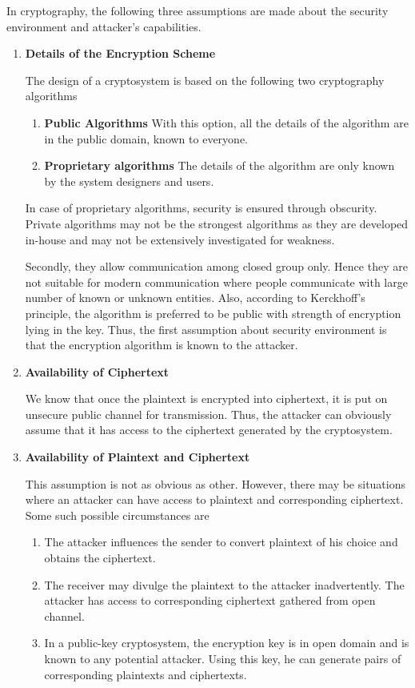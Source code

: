 \documentclass[british]{article}
\begin{document}
In cryptography, the following three assumptions are made about the
security environment and attacker\textquoteright s capabilities.
\begin{enumerate}
\item \textbf{Details of the Encryption Scheme}

The design of a cryptosystem is based on the following two cryptography
algorithms \textminus{}
\begin{enumerate}
\item \textbf{Public Algorithms \textminus{}} With this option, all the
details of the algorithm are in the public domain, known to everyone.
\item \textbf{Proprietary algorithms \textminus{} }The details of the algorithm
are only known by the system designers and users.
\end{enumerate}
In case of proprietary algorithms, security is ensured through obscurity.
Private algorithms may not be the strongest algorithms as they are
developed in-house and may not be extensively investigated for weakness.

\noindent Secondly, they allow communication among closed group only.
Hence they are not suitable for modern communication where people
communicate with large number of known or unknown entities. Also,
according to Kerckhoff\textquoteright s principle, the algorithm is
preferred to be public with strength of encryption lying in the key.
Thus, the first assumption about security environment is that the
encryption algorithm is known to the attacker.
\item \textbf{Availability of Ciphertext}

We know that once the plaintext is encrypted into ciphertext, it is
put on unsecure public channel for transmission. Thus, the attacker
can obviously assume that it has access to the ciphertext generated
by the cryptosystem.
\item \textbf{Availability of Plaintext and Ciphertext}

This assumption is not as obvious as other. However, there may be
situations where an attacker can have access to plaintext and corresponding
ciphertext. Some such possible circumstances are \textminus{}
\begin{enumerate}
\item The attacker influences the sender to convert plaintext of his choice
and obtains the ciphertext.
\item The receiver may divulge the plaintext to the attacker inadvertently.
The attacker has access to corresponding ciphertext gathered from
open channel.
\item In a public-key cryptosystem, the encryption key is in open domain
and is known to any potential attacker. Using this key, he can generate
pairs of corresponding plaintexts and ciphertexts.
\end{enumerate}
\end{enumerate}
\end{document}
